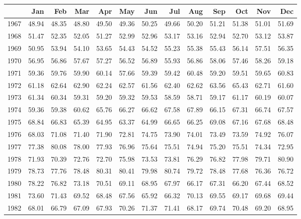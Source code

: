 \begin{longtable}{rrrrrrrrrrrrr}
  \hline
 & Jan & Feb & Mar & Apr & May & Jun & Jul & Aug & Sep & Oct & Nov & Dec \\ 
  \hline
1967 & 48.94 & 48.35 & 48.80 & 49.50 & 49.36 & 50.25 & 49.66 & 50.20 & 51.21 & 51.38 & 51.01 & 51.69 \\ 
  1968 & 51.47 & 52.35 & 52.05 & 51.27 & 52.99 & 52.96 & 53.17 & 53.16 & 52.94 & 52.70 & 53.12 & 53.87 \\ 
  1969 & 50.95 & 53.94 & 54.10 & 53.65 & 54.43 & 54.52 & 55.23 & 55.38 & 55.43 & 56.14 & 57.51 & 56.35 \\ 
  1970 & 56.95 & 56.86 & 57.67 & 57.27 & 56.52 & 56.89 & 55.93 & 56.86 & 58.06 & 57.46 & 58.26 & 59.18 \\ 
  1971 & 59.36 & 59.76 & 59.90 & 60.14 & 57.66 & 59.39 & 59.42 & 60.48 & 59.20 & 59.51 & 59.65 & 60.83 \\ 
  1972 & 61.18 & 62.64 & 62.90 & 62.24 & 62.57 & 61.56 & 62.40 & 62.62 & 63.56 & 65.43 & 62.71 & 61.60 \\ 
  1973 & 61.34 & 60.34 & 59.31 & 59.20 & 59.32 & 59.53 & 58.59 & 58.71 & 59.17 & 61.17 & 60.19 & 60.07 \\ 
  1974 & 59.36 & 59.38 & 60.62 & 65.76 & 66.27 & 66.62 & 67.58 & 67.89 & 66.15 & 67.31 & 66.74 & 67.57 \\ 
  1975 & 68.84 & 66.83 & 65.39 & 64.95 & 63.37 & 64.99 & 66.65 & 66.25 & 69.08 & 67.16 & 67.68 & 68.48 \\ 
  1976 & 68.03 & 71.08 & 71.40 & 71.90 & 72.81 & 74.75 & 73.90 & 74.01 & 73.49 & 73.59 & 74.92 & 76.07 \\ 
  1977 & 77.38 & 80.08 & 78.00 & 77.93 & 76.96 & 75.64 & 75.51 & 74.94 & 75.20 & 75.51 & 74.34 & 72.95 \\ 
  1978 & 71.93 & 70.39 & 72.76 & 72.70 & 75.98 & 73.53 & 73.81 & 76.29 & 76.82 & 77.98 & 79.71 & 80.90 \\ 
  1979 & 78.73 & 77.76 & 78.48 & 80.31 & 80.41 & 79.98 & 80.74 & 79.72 & 78.48 & 77.68 & 76.36 & 76.72 \\ 
  1980 & 78.22 & 76.82 & 73.18 & 70.51 & 69.11 & 68.95 & 67.97 & 66.17 & 67.31 & 66.20 & 67.44 & 68.52 \\ 
  1981 & 73.60 & 71.43 & 69.52 & 68.48 & 67.56 & 65.92 & 66.32 & 70.13 & 69.55 & 69.17 & 69.68 & 69.44 \\ 
  1982 & 68.01 & 66.79 & 67.09 & 67.93 & 70.26 & 71.37 & 71.41 & 68.17 & 69.74 & 70.48 & 69.20 & 68.95 \\ 

\end{longtable}
